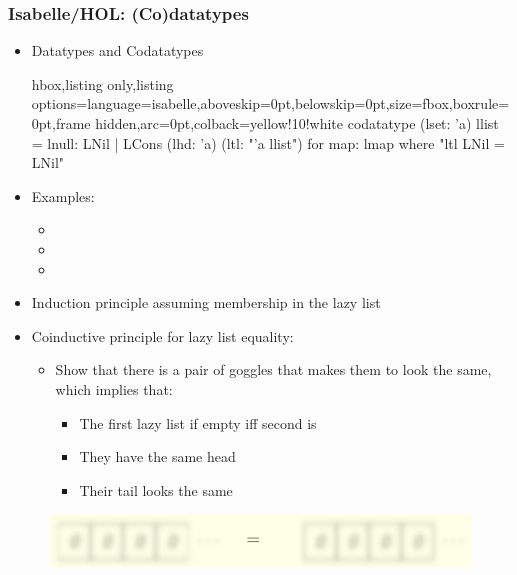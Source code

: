 \documentclass[aspectratio=169,10pt]{beamer}
\begin{document}
\begin{frame}[fragile]
  \frametitle{Isabelle/HOL: (Co)datatypes}
  \begin{itemize}
    \item Datatypes and Codatatypes
\vspace*{-1ex}
          \begin{tcblisting}{hbox,listing only,listing options={language=isabelle,aboveskip=0pt,belowskip=0pt},size=fbox,boxrule=0pt,frame hidden,arc=0pt,colback=yellow!10!white}
codatatype (lset: 'a) llist = lnull: LNil | LCons (lhd: 'a) (ltl: "'a llist")
  for map: lmap where "ltl LNil = LNil"
          \end{tcblisting}
\vspace*{-1ex}
    \item Examples:
\vspace*{-1ex}
          \begin{itemize}
            \item {}
            \item {}
            \item {}
          \end{itemize}
\vspace*{-1ex}
          \pause
    \item Induction principle assuming membership in the lazy list
    \item Coinductive principle for lazy list equality:
          \begin{itemize}
            \item Show that there is a pair of goggles that makes them to look the same, which implies that:
                  \begin{itemize}
                    \item The first lazy list if empty iff second is
                    \item They have the same head
                    \item Their tail looks the same
                  \end{itemize}
          \end{itemize}
  \end{itemize}
\vspace*{-1ex}
  \begin{figure}
    \centering
    \includegraphics[scale=0.4]{equality_1.png}
  \end{figure}
\end{frame}
\end{document}
